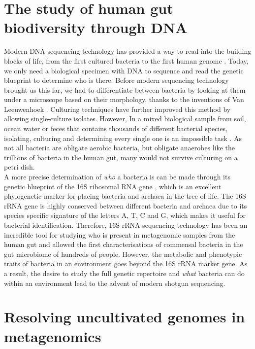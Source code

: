 \section{The study of human gut biodiversity through DNA}

Modern DNA sequencing technology has provided a way to read into the building blocks of life, from the first cultured bacteria to the first human genome \cite{Koonin1996-vp,Lander2001-vu}. Today, we only need a biological specimen with DNA to sequence and read the genetic blueprint to determine who is there. Before modern sequencing technology brought us this far, we had to differentiate between bacteria by looking at them under a microscope based on their morphology, thanks to the inventions of Van Leeuwenhoek \cite{Lane2015-yo}. Culturing techniques have further improved this method by allowing single-culture isolates. However, In a mixed biological sample from soil, ocean water or feces that contains thousands of different bacterial species, isolating, culturing and determining every single one is an impossible task \cite{Staley1985-zr}. As not all bacteria are obligate aerobic bacteria, but obligate anaerobes like the trillions of bacteria in the human gut, many would not survive culturing on a petri dish.\\

\noindent
A more precise determination of \textit{who} a bacteria is can be made through its genetic blueprint of the 16S ribosomal RNA gene \cite{Nr1985-yh}, which is an excellent phylogenetic marker for placing bacteria and archaea in the tree of life. The 16S rRNA gene is highly conserved between different bacteria and archaea due to its species specific signature of the letters A, T, C and G, which makes it useful for bacterial identification. Therefore, 16S rRNA sequencing technology has been an incredible tool for studying who is present in metagenomic samples from the human gut and allowed the first characterisations of commensal bacteria in the gut microbiome of hundreds of people. However, the metabolic and phenotypic traits of bacteria in an environment goes beyond the 16S rRNA marker gene. As a result, the desire to study the full genetic repertoire and \textit{what} bacteria can do within an environment lead to the advent of modern shotgun sequencing.

\section{Resolving uncultivated genomes in metagenomics}

